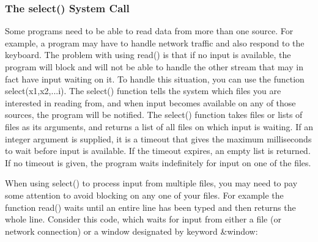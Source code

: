 \subsubsection[The select() System Call]{The select() System Call}
Some programs need to be able to read data from more than one source.
For example, a program may have to handle network traffic and also
respond to the keyboard. The problem with using
\textsf{read()} is that if no input is available, the program will
block and will not be able to handle the other stream that may in fact
have input waiting on it. To handle this situation, you can use the
function \textsf{select(x1,x2,...i)}. The
\textsf{select()} function tells the system which files
you are interested in reading from, and when input becomes available on
any of those sources, the program will be notified. The
\textsf{select()} function takes files or lists of files as its
arguments, and returns a list of all files on which input is waiting.
If an integer argument is supplied, it is a timeout that gives the
maximum milliseconds to wait before input is available. If the timeout
expires, an empty list is returned. If no timeout is given, the program
waits indefinitely for input on one of the files.


When using \textsf{select()} to process input from multiple files, you
may need to pay some attention to avoid blocking on any one of your
files. For example the function \textsf{read()} waits until an entire
line has been typed and then returns the whole line. Consider this
code, which waits for input from either a file (or network connection)
or a window designated by keyword \textsf{\&window}:


